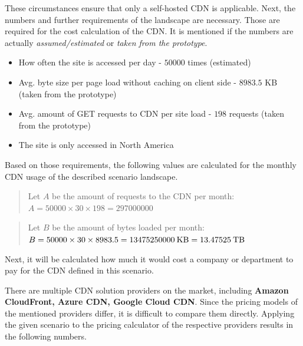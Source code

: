These circumstances ensure that only a self-hosted CDN is applicable.
Next, the numbers and further requirements of the landscape are necessary. Those are required for the cost calculation of the CDN.
It is mentioned if the numbers are actually \textit{assumed/estimated} or \textit{taken from the prototype}.

\begin{itemize}[noitemsep]
	\item How often the site is accessed per day - $50 000$ times (estimated)
	\item Avg. byte size per page load without caching on client side - $8983.5$ KB (taken from the prototype)
	\item Avg. amount of GET requests to CDN per site load - $198$ requests (taken from the prototype)
	\item The site is only accessed in North America 
\end{itemize} 

Based on those requirements, the following values are calculated for the monthly CDN usage of the described scenario landscape.

\begin{quote}
	\begin{center}
		Let $A$ be the amount of requests to the CDN per month:
		\begin{math}
			A = 50000 \times 30 \times 198 = 297000000
		\end{math}
	\end{center} 
\end{quote}

\begin{quote}
	\begin{center}
		Let $B$ be the amount of bytes loaded per month:
		\begin{math}
			B = 50000 \times 30 \times 8983.5 = 13475250000 \: $KB$ \; = 13.47525 \: $TB$
		\end{math}
	\end{center} 
\end{quote}

Next, it will be calculated how much it would cost a company or department to pay for the CDN defined in this scenario.

There are multiple CDN solution providers on the market, including \textbf{Amazon CloudFront, Azure CDN, Google Cloud CDN}. \cite{top_10_cdn}
Since the pricing models of the mentioned providers differ, it is difficult to compare them directly. Applying the given scenario to the pricing calculator of the respective providers results in the following numbers.

